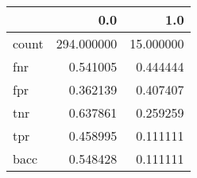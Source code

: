 \begin{tabular}{lrr}
\toprule
{} &         0.0 &        1.0 \\
\midrule
count &  294.000000 &  15.000000 \\
fnr   &    0.541005 &   0.444444 \\
fpr   &    0.362139 &   0.407407 \\
tnr   &    0.637861 &   0.259259 \\
tpr   &    0.458995 &   0.111111 \\
bacc  &    0.548428 &   0.111111 \\
\bottomrule
\end{tabular}

